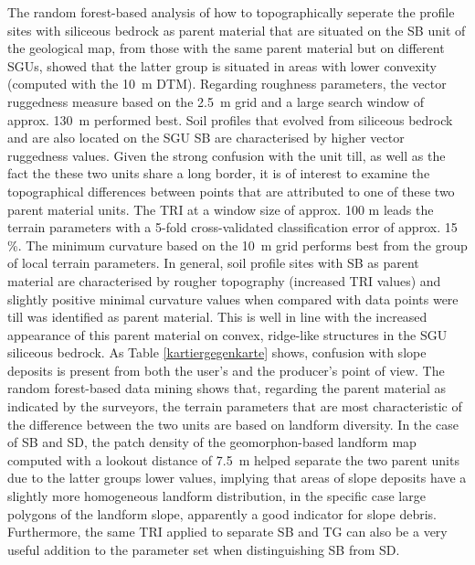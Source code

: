 \documentclass[preprint,12pt,authoryear]{elsarticle}
\begin{document}
The random forest-based analysis of how to topographically seperate the profile sites with siliceous bedrock as parent material that are situated on the SB unit of the geological map, from those with the same parent material but on different SGUs, showed that the latter group is situated in areas with lower convexity (computed with the 10~m DTM). Regarding roughness parameters, the vector ruggedness measure based on the 2.5~m grid and a large search window of approx. 130~m performed best. Soil profiles that evolved from siliceous bedrock and are also located on the SGU SB are characterised by higher vector ruggedness values. 
Given the strong confusion with the unit till, as well as the fact the these two units share a long border, it is of interest to examine the topographical differences between points that are attributed to one of these two parent material units. The TRI at a window size of approx. 100 m leads the terrain parameters with a 5-fold cross-validated classification error of approx. 15 \%. The minimum curvature based on the 10~m grid performs best from the group of local terrain parameters. In general, soil profile sites with SB as parent material are characterised by rougher topography (increased TRI values) and slightly positive minimal curvature values when compared with data points were till was identified as parent material. This is well in line with the increased appearance of this parent material on  convex, ridge-like structures in the SGU siliceous bedrock. As Table \ref{kartiergegenkarte} shows, confusion with slope deposits is present from both the user's and the producer's point of view. The random forest-based data mining shows that, regarding the parent material as indicated by the surveyors, the terrain parameters that are most characteristic of the difference between the two units are based on landform diversity. In the case of SB and SD, the patch density of the geomorphon-based landform map computed with a lookout distance of 7.5~m helped separate the two parent units due to the latter groups lower values, implying that areas of slope deposits have a slightly more homogeneous landform distribution, in the specific case large polygons of the landform slope, apparently a good indicator for slope debris.  Furthermore, the same TRI applied to separate SB and TG can also be a very useful addition to the parameter set when distinguishing SB from SD. 
\end{document}

